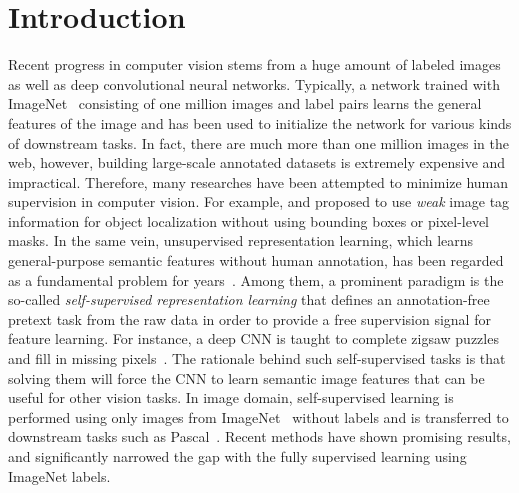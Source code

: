 \documentclass[letterpaper]{article} \usepackage{aaai19}  \usepackage{times}  \usepackage{helvet}  \usepackage{courier}  \usepackage{url}  \usepackage{graphicx}  \frenchspacing  \setlength{\pdfpagewidth}{8.5in}  \setlength{\pdfpageheight}{11in}
\begin{document}
\section{Introduction}
Recent progress in computer vision stems from a huge amount of labeled images as well as deep convolutional neural networks. Typically, a network trained with ImageNet~\cite{imagenet} consisting of one million images and label pairs learns the general features of the image and has been used to initialize the network for various kinds of downstream tasks. In fact, there are much more than one million images in the web, however, building large-scale annotated datasets is extremely expensive and impractical. Therefore, many researches have been attempted to minimize human supervision in computer vision. For example, \cite{oquab2015object} and \cite{kim2017two} proposed to use \textit{weak} image tag information for object localization without using bounding boxes or pixel-level masks. In the same vein, unsupervised representation learning, which learns general-purpose semantic features without human annotation, has been regarded as a fundamental problem for years~\cite{bengio2013representation}. Among them, a prominent paradigm is the so-called \textit{self-supervised representation learning} that defines an annotation-free pretext task from the raw data in order to provide a free supervision signal for feature learning. For instance, a deep CNN is taught to complete zigsaw puzzles~\cite{noroozi2016unsupervised} and fill in missing pixels~\cite{Pathak2016inpainting}.  The rationale behind such self-supervised tasks is that solving them will force the CNN to learn semantic image features that can be useful for other vision tasks. In image domain, self-supervised learning is performed using only images from ImageNet~\cite{imagenet} without labels and is transferred to downstream tasks such as Pascal~\cite{pascal-voc-2007,pascal-voc-2012}. Recent methods have shown promising results, and significantly narrowed the gap with the fully supervised learning using ImageNet labels.
\end{document}
